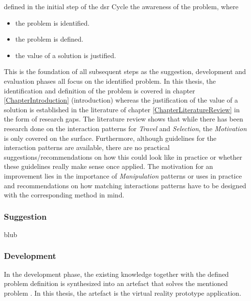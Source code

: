 \cite{Hevner2010} defined in the initial step of the \gls{dsr} Cycle the awareness of the problem, where
\begin{itemize}[noitemsep,nolistsep]
	\item the problem is identified.
	\item the problem is defined.
	\item the value of a solution is justified.
\end{itemize}
This is the foundation of all subsequent steps as the suggestion, development and evaluation phases all focus on the identified problem. \newline
In this thesis, the identification and definition of the problem is covered in chapter \ref{ChapterIntroduction} (introduction) whereas the justification of the value of a solution is established in the literature of chapter \ref{ChapterLiteratureReview} in the form of research gaps.
The literature review shows that while there has been research done on the interaction patterns for \textit{Travel} and \textit{Selection}, the \textit{Motivation} is only covered on the surface. Furthermore, although guidelines for the interaction patterns are available, there are no practical suggestions/recommendations on how this could look like in practice or whether these guidelines really make sense once applied. The motivation for an improvement lies in the importance of \textit{Manipulation} patterns or uses in practice and recommendations on how matching interactions patterns have to be designed with the corresponding method in mind.



\subsubsection{Suggestion}

blub



\subsubsection{Development}

In the development phase, the existing knowledge together with the defined problem definition is synthesized into an artefact that solves the mentioned problem \citep{Vaishnavi2008}. In this thesis, the artefact is the virtual reality prototype application.


